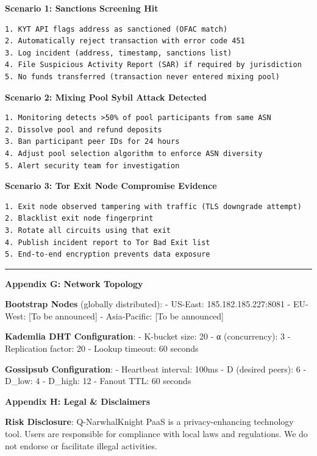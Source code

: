 \documentclass[
  11pt,
]{article}
\begin{document}
\textbf{Scenario 1: Sanctions Screening Hit}

\begin{verbatim}
1. KYT API flags address as sanctioned (OFAC match)
2. Automatically reject transaction with error code 451
3. Log incident (address, timestamp, sanctions list)
4. File Suspicious Activity Report (SAR) if required by jurisdiction
5. No funds transferred (transaction never entered mixing pool)
\end{verbatim}

\textbf{Scenario 2: Mixing Pool Sybil Attack Detected}

\begin{verbatim}
1. Monitoring detects >50% of pool participants from same ASN
2. Dissolve pool and refund deposits
3. Ban participant peer IDs for 24 hours
4. Adjust pool selection algorithm to enforce ASN diversity
5. Alert security team for investigation
\end{verbatim}

\textbf{Scenario 3: Tor Exit Node Compromise Evidence}

\begin{verbatim}
1. Exit node observed tampering with traffic (TLS downgrade attempt)
2. Blacklist exit node fingerprint
3. Rotate all circuits using that exit
4. Publish incident report to Tor Bad Exit list
5. End-to-end encryption prevents data exposure
\end{verbatim}

\begin{center}\rule{0.5\linewidth}{0.5pt}\end{center}

\textbf{Appendix G: Network Topology}

\textbf{Bootstrap Nodes} (globally distributed): - US-East:
185.182.185.227:8081 - EU-West: {[}To be announced{]} - Asia-Pacific:
{[}To be announced{]}

\textbf{Kademlia DHT Configuration}: - K-bucket size: 20 - α
(concurrency): 3 - Replication factor: 20 - Lookup timeout: 60 seconds

\textbf{Gossipsub Configuration}: - Heartbeat interval: 100ms - D
(desired peers): 6 - D\_low: 4 - D\_high: 12 - Fanout TTL: 60 seconds

\textbf{Appendix H: Legal \& Disclaimers}

\textbf{Risk Disclosure}: Q-NarwhalKnight PaaS is a privacy-enhancing
technology tool. Users are responsible for compliance with local laws
and regulations. We do not endorse or facilitate illegal activities.
\end{document}
